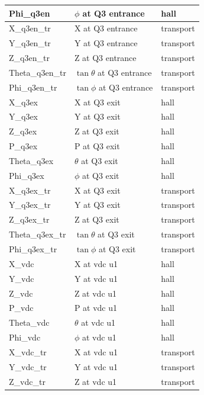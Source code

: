 \documentclass[11pt]{amsart}
\begin{document}
\begin{longtable}{| l | l | l |}
\hline
Phi\_q3en            & $\phi$ at Q3 entrance  & hall \\
\hline
X\_q3en\_tr           & X at Q3 entrance  & transport\\
\hline
Y\_q3en\_tr           & Y at Q3 entrance  & transport\\
\hline
Z\_q3en\_tr           & Z at Q3 entrance  & transport\\
\hline
Theta\_q3en\_tr       & $\tan{\theta}$ at Q3 entrance  & transport\\
\hline
Phi\_q3en\_tr         & $\tan{\phi}$ at Q3 entrance  & transport\\
\hline
\hline
X\_q3ex              & X at Q3 exit  & hall \\
\hline
Y\_q3ex              & Y at Q3 exit  & hall \\
\hline
Z\_q3ex              & Z at Q3 exit  & hall \\
\hline
P\_q3ex              & P at Q3 exit  & hall \\
\hline
Theta\_q3ex          & $\theta$ at Q3 exit  & hall \\
\hline
Phi\_q3ex            & $\phi$ at Q3 exit  & hall \\
\hline
X\_q3ex\_tr           & X at Q3 exit  & transport\\
\hline
Y\_q3ex\_tr           & Y at Q3 exit  & transport\\
\hline
Z\_q3ex\_tr           & Z at Q3 exit  & transport\\
\hline
Theta\_q3ex\_tr       & $\tan{\theta}$ at Q3 exit  & transport\\
\hline
Phi\_q3ex\_tr         & $\tan{\phi}$ at Q3 exit  & transport\\
\hline
\hline
X\_vdc              & X at vdc u1 & hall \\
\hline
Y\_vdc              & Y at vdc u1 & hall \\
\hline
Z\_vdc              & Z at vdc u1 & hall \\
\hline
P\_vdc              & P at vdc u1 & hall \\
\hline
Theta\_vdc          & $\theta$ at vdc u1 & hall \\
\hline
Phi\_vdc            & $\phi$ at vdc u1 & hall \\
\hline
X\_vdc\_tr           & X at vdc u1 & transport \\
\hline
Y\_vdc\_tr           & Y at vdc u1 & transport \\
\hline
Z\_vdc\_tr           & Z at vdc u1 & transport \\

\end{longtable}
\end{document}
